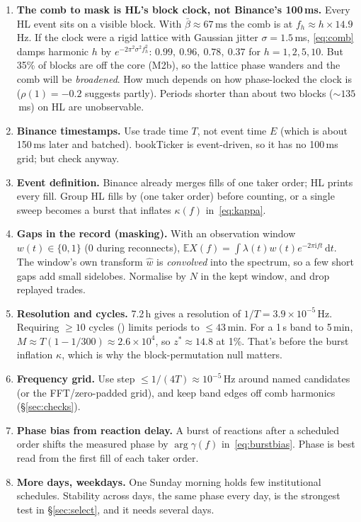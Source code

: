 \documentclass[11pt,a4paper]{article}
\newcommand{\code}[1]{\texttt{\detokenize{#1}}}
\newcommand{\E}{\mathbb{E}}
\newcommand{\ii}{\mathrm{i}}
\newcommand{\dd}{\,\mathrm{d}}
\begin{document}
\begin{enumerate}
  \item \textbf{The comb to mask is HL's block clock, not Binance's 100\,ms.} Every HL event sits on a visible block. With $\bar\beta\approx67$\,ms the comb is at
        $f_h\approx h\times14.9$\,Hz. If the clock were a rigid lattice with Gaussian jitter $\sigma=1.5$\,ms, \eqref{eq:comb} damps harmonic $h$ by
        $e^{-2\pi^2\sigma^2f_h^2}$: $0.99,\ 0.96,\ 0.78,\ 0.37$ for $h=1,2,5,10$. But 35\% of blocks are off the core (M2b), so the lattice phase wanders and the comb will be
        \emph{broadened}. How much depends on how phase-locked the clock is ($\rho(1)=-0.2$ suggests partly). Periods shorter than about two blocks ($\sim135$\,ms) on HL are
        unobservable.
  \item \textbf{Binance timestamps.} Use trade time $T$, not event time $E$ (which is about 150\,ms later and batched). bookTicker is event-driven, so it has no 100\,ms grid;
        but check \code{sampling_report} anyway.
  \item \textbf{Event definition.} Binance \code{aggTrade} already merges fills of one taker order; HL prints every fill. Group HL fills by \code{hash} (one taker order)
        before counting, or a single sweep becomes a burst that inflates $\kappa(f)$ in~\eqref{eq:kappa}.
  \item \textbf{Gaps in the record (masking).} With an observation window $w(t)\in\{0,1\}$ (0 during reconnects), $\E X(f)=\int\lambda(t)w(t)e^{-2\pi\ii ft}\dd t$. The window's
        own transform $\hat w$ is \emph{convolved} into the spectrum, so a few short gaps add small sidelobes. Normalise by $N$ in the kept window, and drop replayed trades.
  \item \textbf{Resolution and cycles.} 7.2\,h gives a resolution of $1/T=3.9\times10^{-5}$\,Hz. Requiring $\ge10$ cycles (\code{rayleigh_test}) limits periods to $\le43$\,min.
        For a 1\,s band to 5\,min, $M\approx T(1-1/300)\approx2.6\times10^4$, so $z^\ast\approx14.8$ at 1\%. That's before the burst inflation $\kappa$, which is why the
        block-permutation null matters.
  \item \textbf{Frequency grid.} Use step $\le1/(4T)\approx10^{-5}$\,Hz around named candidates (or the FFT/zero-padded grid), and keep band edges off comb harmonics (\S\ref{sec:checks}).
  \item \textbf{Phase bias from reaction delay.} A burst of reactions after a scheduled order shifts the measured phase by $\arg\gamma(f)$ in~\eqref{eq:burstbias}. Phase is
        best read from the first fill of each taker order.
  \item \textbf{More days, weekdays.} One Sunday morning holds few institutional schedules. Stability across days, the same phase every day, is the strongest
        test in \S\ref{sec:select}, and it needs several days.
\end{enumerate}
\end{document}
